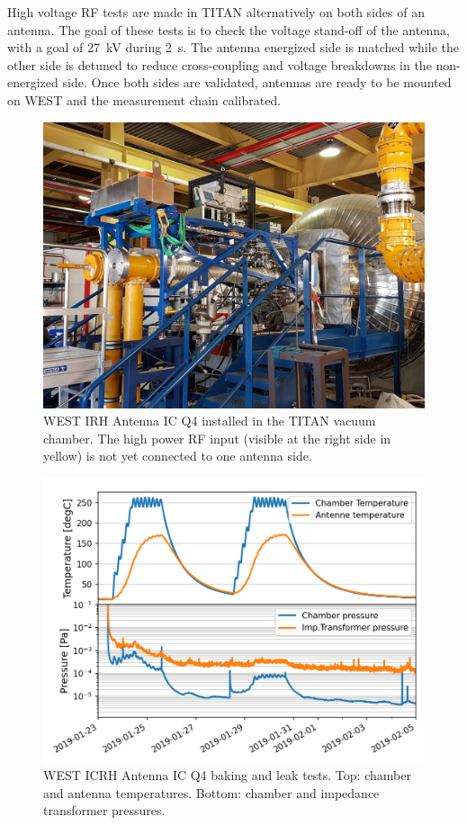 \documentclass[12p]{iopart}
\begin{document}
High voltage RF tests are made in TITAN alternatively on both sides of an antenna. The goal of these tests is to check the voltage stand-off of the antenna, with a goal of \SI{27}{\kilo\volt} during \SI{2}{\second}. The antenna energized side is matched while the other side is detuned to reduce cross-coupling and voltage breakdowns in the non-energized side. Once both sides are validated, antennas are ready to be mounted on WEST and the measurement chain calibrated.

\begin{figure}
	\centering
	\includegraphics[width=0.95\linewidth]{figures/titan}
	\caption{WEST IRH Antenna IC Q4 installed in the TITAN vacuum chamber. The high power RF input (visible at the right side in yellow) is not yet connected to one antenna side.}
	\label{fig:titan}
\end{figure}


\begin{figure}
	\centering
	\includegraphics[width=0.95\linewidth]{figures/baking}
	\caption{WEST ICRH Antenna IC Q4 baking and leak tests. Top: chamber and antenna temperatures. Bottom: chamber and impedance transformer pressures.}
	\label{fig:baking}
\end{figure}
\end{document}
